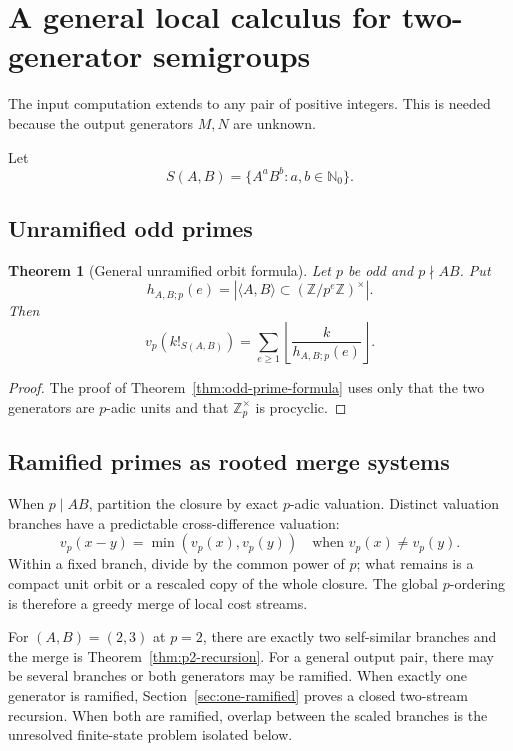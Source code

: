 \documentclass[11pt,oneside]{article}
\newtheorem{theorem}{Theorem}[section]
\theoremstyle{definition}
\theoremstyle{remark}
\newcommand{\Nzero}{\mathbb N_0}
\newcommand{\Z}{\mathbb Z}
\newcommand{\floor}[1]{\left\lfloor #1\right\rfloor}
\begin{document}
\section{A general local calculus for two-generator semigroups}
\label{sec:general-pair}

The input computation extends to any pair of positive integers.  This is needed because the
output generators \(M,N\) are unknown.

Let
\[
 S(A,B)=\{A^aB^b:a,b\in\Nzero\}.
\]

\subsection{Unramified odd primes}

\begin{theorem}[General unramified orbit formula]
\label{thm:general-unramified}
Let \(p\) be odd and \(p\nmid AB\).  Put
\[
 h_{A,B;p}(e)
 =
 |\langle A,B\rangle\subset(\Z/p^e\Z)^\times|.
\]
Then
\begin{equation}
 v_p(k!_{S(A,B)})
 =
 \sum_{e\ge1}\floor{\frac{k}{h_{A,B;p}(e)}}.
 \label{eq:general-unramified}
\end{equation}
\end{theorem}

\begin{proof}
The proof of Theorem~\ref{thm:odd-prime-formula} uses only that the two generators are
\(p\)-adic units and that \(\Z_p^\times\) is procyclic.
\end{proof}

\subsection{Ramified primes as rooted merge systems}

When \(p\mid AB\), partition the closure by exact \(p\)-adic valuation.  Distinct valuation
branches have a predictable cross-difference valuation:
\[
 v_p(x-y)=\min(v_p(x),v_p(y))
 \quad\text{when }v_p(x)\ne v_p(y).
\]
Within a fixed branch, divide by the common power of \(p\); what remains is a compact unit
orbit or a rescaled copy of the whole closure.  The global \(p\)-ordering is therefore a
greedy merge of local cost streams.

For \((A,B)=(2,3)\) at \(p=2\), there are exactly two self-similar branches and the merge is
Theorem~\ref{thm:p2-recursion}.  For a general output pair, there may be several branches or both generators may be
ramified.  When exactly one generator is ramified, Section~\ref{sec:one-ramified} proves a
closed two-stream recursion.  When both are ramified, overlap between the scaled branches is
the unresolved finite-state problem isolated below.
\end{document}
